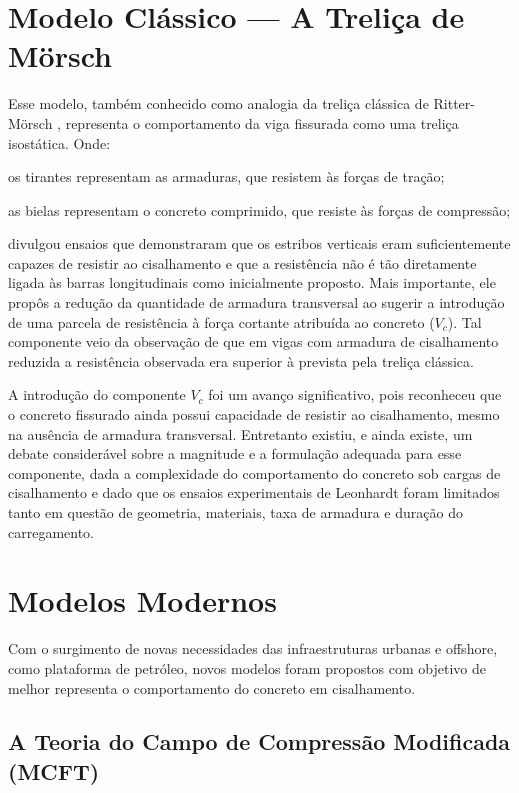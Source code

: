 \section{Modelo Clássico --- A Treliça de Mörsch}
Esse modelo, também conhecido como analogia da treliça clássica de Ritter-Mörsch , representa o comportamento da viga fissurada como uma treliça isostática. Onde:

\begin{alineas}
    \item os tirantes representam as armaduras, que resistem às forças de tração;
    \item as bielas representam o concreto comprimido, que resiste às forças de compressão;
\end{alineas}

\textcite{Leonhardt1964} divulgou ensaios que demonstraram que os estribos verticais eram suficientemente capazes de resistir ao cisalhamento e que a resistência não é tão diretamente ligada às barras longitudinais como inicialmente proposto. Mais importante, ele propôs a redução da quantidade de armadura transversal ao sugerir a introdução de uma parcela de resistência à força cortante atribuída ao concreto ($V_c$). Tal componente veio da observação de que em vigas com armadura de cisalhamento reduzida a resistência observada era superior à prevista pela treliça clássica.

A introdução do componente $V_c$ foi um avanço significativo, pois reconheceu que o concreto fissurado ainda possui capacidade de resistir ao cisalhamento, mesmo na ausência de armadura transversal. Entretanto existiu, e ainda existe, um debate considerável sobre a magnitude e a formulação adequada para esse componente, dada a complexidade do comportamento do concreto sob cargas de cisalhamento e dado que os ensaios experimentais de Leonhardt foram limitados tanto em questão de geometria, materiais, taxa de armadura e duração do carregamento.

\section{Modelos Modernos}

Com o surgimento de novas necessidades das infraestruturas urbanas e offshore, como plataforma de petróleo, novos modelos foram propostos com objetivo de melhor representa o comportamento do concreto em cisalhamento. 

\subsection{A Teoria do Campo de Compressão Modificada (MCFT)}

